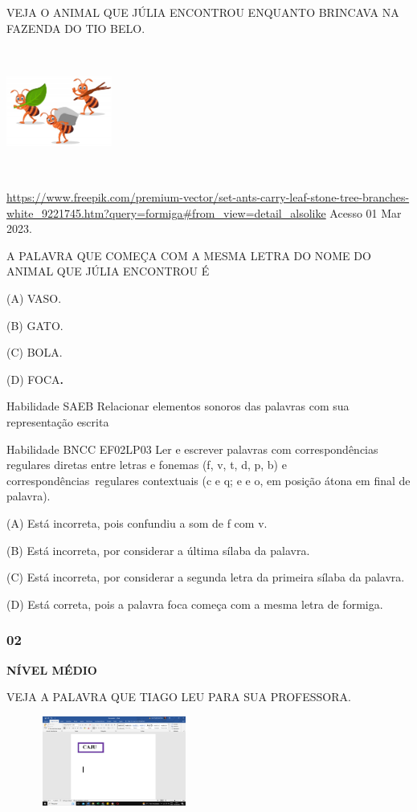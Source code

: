 VEJA O ANIMAL QUE JÚLIA ENCONTROU ENQUANTO BRINCAVA NA FAZENDA DO TIO
BELO.

\includegraphics[width=1.36528in,height=1.64861in]{media/image42.jpeg}

\url{https://www.freepik.com/premium-vector/set-ants-carry-leaf-stone-tree-branches-white_9221745.htm?query=formiga\#from_view=detail_alsolike}
Acesso 01 Mar 2023.

A PALAVRA QUE COMEÇA COM A MESMA LETRA DO NOME DO ANIMAL QUE JÚLIA
ENCONTROU É

(A) VASO.

(B) GATO.

(C) BOLA.

(D) FOCA\textbf{.}

Habilidade SAEB Relacionar elementos sonoros das palavras com sua
representação escrita

Habilidade BNCC EF02LP03 Ler e escrever palavras com correspondências
regulares diretas entre letras e fonemas (f, v, t, d, p, b) e
correspondências~regulares contextuais (c e q; e e o, em posição átona
em final de palavra).

\protect\hypertarget{_Hlk129110473}{}{}(A) Está incorreta, pois
confundiu a som de f com v.

(B) Está incorreta, por considerar a última sílaba da palavra.

(C) Está incorreta, por considerar a segunda letra da primeira sílaba da
palavra.

(D) Está correta, pois a palavra foca começa com a mesma letra de
formiga.

\subsubsection{02}\label{section-13}

\textbf{NÍVEL MÉDIO}

VEJA A PALAVRA QUE TIAGO LEU PARA SUA PROFESSORA.

\includegraphics[width=2.79792in,height=1.15833in]{media/image43.png}

